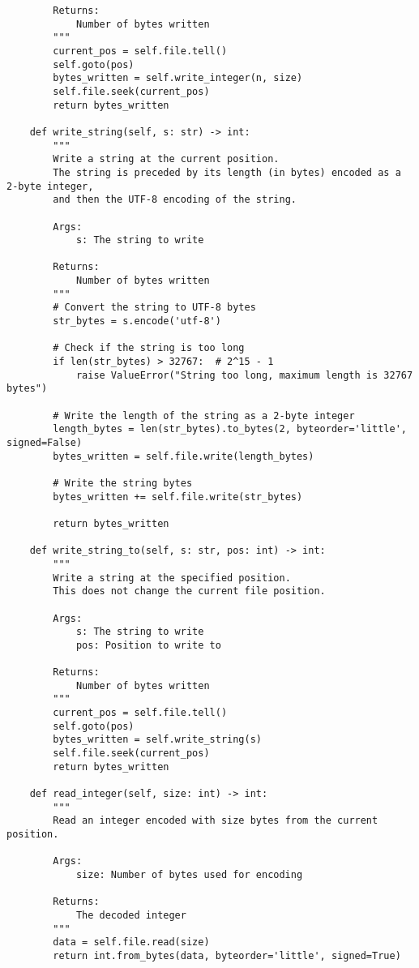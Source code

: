 \documentclass[utf8]{article}
\begin{document}
\begin{verbatim}
        Returns:
            Number of bytes written
        """
        current_pos = self.file.tell()
        self.goto(pos)
        bytes_written = self.write_integer(n, size)
        self.file.seek(current_pos)
        return bytes_written
    
    def write_string(self, s: str) -> int:
        """
        Write a string at the current position.
        The string is preceded by its length (in bytes) encoded as a 2-byte integer,
        and then the UTF-8 encoding of the string.
        
        Args:
            s: The string to write
            
        Returns:
            Number of bytes written
        """
        # Convert the string to UTF-8 bytes
        str_bytes = s.encode('utf-8')
        
        # Check if the string is too long
        if len(str_bytes) > 32767:  # 2^15 - 1
            raise ValueError("String too long, maximum length is 32767 bytes")
        
        # Write the length of the string as a 2-byte integer
        length_bytes = len(str_bytes).to_bytes(2, byteorder='little', signed=False)
        bytes_written = self.file.write(length_bytes)
        
        # Write the string bytes
        bytes_written += self.file.write(str_bytes)
        
        return bytes_written
    
    def write_string_to(self, s: str, pos: int) -> int:
        """
        Write a string at the specified position.
        This does not change the current file position.
        
        Args:
            s: The string to write
            pos: Position to write to
            
        Returns:
            Number of bytes written
        """
        current_pos = self.file.tell()
        self.goto(pos)
        bytes_written = self.write_string(s)
        self.file.seek(current_pos)
        return bytes_written
    
    def read_integer(self, size: int) -> int:
        """
        Read an integer encoded with size bytes from the current position.
        
        Args:
            size: Number of bytes used for encoding
            
        Returns:
            The decoded integer
        """
        data = self.file.read(size)
        return int.from_bytes(data, byteorder='little', signed=True)
    

\end{verbatim}
\end{document}
